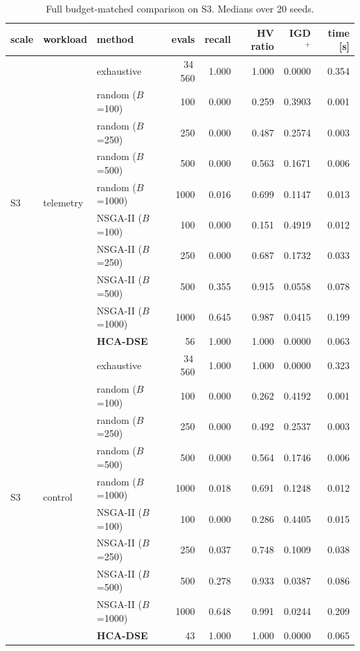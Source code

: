 \documentclass[pdflatex,sn-nature]{sn-jnl}
\theoremstyle{thmstyleone}
\theoremstyle{thmstyletwo}
\theoremstyle{thmstylethree}
\begin{document}
\begin{table}[!htbp]\centering
\caption{Full budget-matched comparison on S3. Medians over 20 seeds.}\label{tabS2}
{\let\scriptsize\tiny\setlength{\tabcolsep}{2pt}\scriptsize
\begin{tabular}{lllrrrrr}
\toprule
scale & workload & method & evals & recall & HV ratio & IGD$^{+}$ & time [s] \\
\midrule
\multirow{10}{*}{S3} & \multirow{10}{*}{telemetry} & exhaustive & 34\,560 & 1.000 & 1.000 & 0.0000 & 0.354 \\
 & & random ($B$=100) & 100 & 0.000 & 0.259 & 0.3903 & 0.001 \\
 & & random ($B$=250) & 250 & 0.000 & 0.487 & 0.2574 & 0.003 \\
 & & random ($B$=500) & 500 & 0.000 & 0.563 & 0.1671 & 0.006 \\
 & & random ($B$=1000) & 1000 & 0.016 & 0.699 & 0.1147 & 0.013 \\
 & & NSGA-II ($B$=100) & 100 & 0.000 & 0.151 & 0.4919 & 0.012 \\
 & & NSGA-II ($B$=250) & 250 & 0.000 & 0.687 & 0.1732 & 0.033 \\
 & & NSGA-II ($B$=500) & 500 & 0.355 & 0.915 & 0.0558 & 0.078 \\
 & & NSGA-II ($B$=1000) & 1000 & 0.645 & 0.987 & 0.0415 & 0.199 \\
 & & \textbf{HCA-DSE} & 56 & 1.000 & 1.000 & 0.0000 & 0.063 \\
\midrule
\multirow{10}{*}{S3} & \multirow{10}{*}{control} & exhaustive & 34\,560 & 1.000 & 1.000 & 0.0000 & 0.323 \\
 & & random ($B$=100) & 100 & 0.000 & 0.262 & 0.4192 & 0.001 \\
 & & random ($B$=250) & 250 & 0.000 & 0.492 & 0.2537 & 0.003 \\
 & & random ($B$=500) & 500 & 0.000 & 0.564 & 0.1746 & 0.006 \\
 & & random ($B$=1000) & 1000 & 0.018 & 0.691 & 0.1248 & 0.012 \\
 & & NSGA-II ($B$=100) & 100 & 0.000 & 0.286 & 0.4405 & 0.015 \\
 & & NSGA-II ($B$=250) & 250 & 0.037 & 0.748 & 0.1009 & 0.038 \\
 & & NSGA-II ($B$=500) & 500 & 0.278 & 0.933 & 0.0387 & 0.086 \\
 & & NSGA-II ($B$=1000) & 1000 & 0.648 & 0.991 & 0.0244 & 0.209 \\
 & & \textbf{HCA-DSE} & 43 & 1.000 & 1.000 & 0.0000 & 0.065 \\

\end{tabular}}
\end{table}
\end{document}
